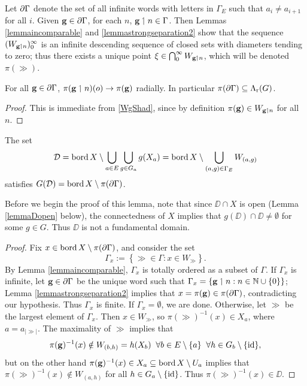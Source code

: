 Let $\partial\Gamma$ denote the set of all infinite words with letters in $\Gamma_E$ such that $a_i \neq a_{i + 1}$ for all $i$. Given $\mathbf g\in\partial\Gamma$, for each $n$, $\mathbf g\upharpoonleft n\in\Gamma$. Then Lemmas \ref{lemmaincomparable} and \ref{lemmastrongseparation2} show that the sequence $(W_{\mathbf g\upharpoonleft n})_0^\infty$ is an infinite descending sequence of closed sets with diameters tending to zero; thus there exists a unique point $\xi\in \bigcap_0^\infty W_{\mathbf g\upharpoonleft n}$, which will be denoted $\pi(\gg)$.

\begin{lemma}
\label{lemmaschottkyradial}
For all $\mathbf g\in\partial\Gamma$, $\pi(\mathbf g\upharpoonleft n)(o)\to \pi(\mathbf g)$ radially. In particular $\pi(\partial\Gamma)\subseteq\Lambda_{\mathrm r}(G)$.
\end{lemma}
\begin{proof}
This is immediate from \eqref{WgShad}, since by definition $\pi(\mathbf g)\in W_{\mathbf g\upharpoonleft n}$ for all $n$.
\end{proof}


\begin{lemma}
\label{lemmaschottkydomain}
The set
\begin{equation}
\label{schottkydomain}
\mathcal D = \operatorname{bord} X \setminus \bigcup_{a\in E}\bigcup_{g\in G_a} g(X_a) = \operatorname{bord} X \setminus \bigcup_{(a,g)\in \Gamma_E} W_{(a,g)}
\end{equation}
satisfies $G(\mathcal D) = \operatorname{bord} X\setminus\pi(\partial\Gamma)$.
\end{lemma}
\noindent Before we begin the proof of this lemma, note that since $\DD\cap X$ is open (Lemma \ref{lemmaDopen} below), the connectedness of $X$ implies that $g(\DD)\cap \DD\neq\emptyset$ for some $g\in G$. Thus $\DD$ is not a fundamental domain.
\begin{proof}
Fix $x\in\operatorname{bord} X\setminus \pi(\partial\Gamma)$, and consider the set
\[
\Gamma_x := \left\{\gg\in \Gamma : x\in W_\gg\right\}.
\]
By Lemma \ref{lemmaincomparable}, $\Gamma_x$ is totally ordered as a subset of $\Gamma$. If $\Gamma_x$ is infinite, let $\mathbf g\in\partial\Gamma$ be the unique word such that $\Gamma_x = \{\gg\given n : n\in\Neur\}$; Lemma \ref{lemmastrongseparation2} implies that $x = \pi(\mathbf g)\in \pi(\partial\Gamma)$, contradicting our hypothesis. Thus $\Gamma_x$ is finite. If $\Gamma_x = \emptyset$, we are done. Otherwise, let $\gg$ be the largest element of $\Gamma_x$. Then $x\in W_\gg$, so $\pi(\gg)^{-1}(x)\in X_a$, where $a = a_{|\gg|}$. The maximality of $\gg$ implies that
\[
\pi(\mathbf g)^{-1}(x) \notin W_{(b,h)} = h(X_b) \;\;\forall b\in E\setminus \{a\} \;\;\forall h\in G_b\setminus\{\mathrm{id}\},
\]
but on the other hand $\pi(\mathbf g)^{-1}(x)\in X_a\subseteq \operatorname{bord} X\setminus U_a$ implies that $\pi(\gg)^{-1}(x)\notin W_{(a,h)}$ for all $h\in G_a\setminus\{\mathrm{id}\}$. Thus $\pi(\gg)^{-1}(x)\in\DD$.
\end{proof}

